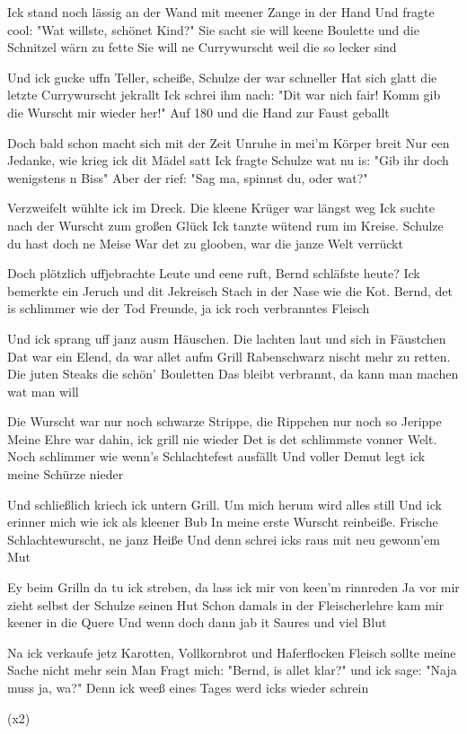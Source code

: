\begin{guitar}
	\pagebreak%
	Ick stand noch lässig an der Wand mit meener Zange in der Hand
	Und fragte cool: "Wat willste, schönet Kind?"
	Sie sacht sie will keene Boulette und die Schnitzel wärn zu fette
	Sie will ne Currywurscht weil die so lecker sind
	
	Und ick gucke uffn Teller, scheiße, Schulze der war schneller
	Hat sich glatt die letzte Currywurscht jekrallt
	Ick schrei ihm nach: "Dit war nich fair! Komm gib die Wurscht mir wieder her!"
	Auf 180 und die Hand zur Faust geballt
	
	 
	
	Doch bald schon macht sich mit der Zeit Unruhe in mei'm Körper breit
	Nur een Jedanke, wie krieg ick dit Mädel satt
	Ick fragte Schulze wat nu is: "Gib ihr doch wenigstens n Biss"
	Aber der rief: "Sag ma, spinnst du, oder wat?"
	
	Verzweifelt wühlte ick im Dreck. Die kleene Krüger war längst weg
	Ick suchte nach der Wurscht zum großen Glück
	Ick tanzte wütend rum im Kreise. Schulze du hast doch ne Meise
	War det zu glooben, war die janze Welt verrückt
	
	Doch plötzlich uffjebrachte Leute und eene ruft, Bernd schläfste heute?
	Ick bemerkte ein Jeruch und dit Jekreisch
	Stach in der Nase wie die Kot. Bernd, det is schlimmer wie der Tod
	Freunde, ja ick roch verbranntes Fleisch
	
	 
	
	Und ick sprang uff janz ausm Häuschen. Die lachten laut und sich in Fäustchen
	Dat war ein Elend, da war allet aufm Grill
	Rabenschwarz nischt mehr zu retten. Die juten Steaks die schön' Bouletten
	Das bleibt verbrannt, da kann man machen wat man will
	
	Die Wurscht war nur noch schwarze Strippe, die Rippchen nur noch so Jerippe
	Meine Ehre war dahin, ick grill nie wieder
	Det is det schlimmste vonner Welt. Noch schlimmer wie wenn's Schlachtefest ausfällt
	Und voller Demut legt ick meine Schürze nieder
	
	Und schließlich kriech ick untern Grill. Um mich herum wird alles still
	Und ick erinner mich wie ick als kleener Bub
	In meine erste Wurscht reinbeiße. Frische Schlachtewurscht, ne janz Heiße
	Und denn schrei icks raus mit neu gewonn'em Mut
	
	 
	
	Ey beim Grilln da tu ick streben, da lass ick mir von keen'm rinnreden
	Ja vor mir zieht selbst der Schulze seinen Hut
	Schon damals in der Fleischerlehre kam mir keener in die Quere
	Und wenn doch dann jab it Saures und viel Blut
	
	Na ick verkaufe jetz Karotten, Vollkornbrot und Haferflocken
	Fleisch sollte meine Sache nicht mehr sein
	Man Fragt mich: "Bernd, is allet klar?" und ick sage: "Naja muss ja, wa?"
	Denn ick weeß eines Tages werd icks wieder schrein
	
	  (x2)
\end{guitar}